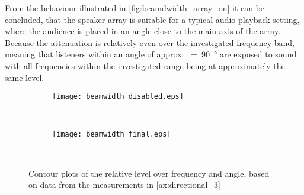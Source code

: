 From the behaviour illustrated in \autoref{fig:beamdwidth_array_on} it can be concluded, that the speaker array is suitable for a typical audio playback setting, where the audience is placed in an angle close to the main axis of the array. Because the attenuation is relatively even over the investigated frequency band, meaning that listeners within an angle of approx. \SI{\pm 90}{\degree} are exposed to sound with all frequencies within the investigated range being at approximately the same level.

\begin{figure}[H]
	\centering
	\begin{subfigure}[c]{\textwidth}
		\texttt{[image: beamwidth\_disabled.eps]}
		\label{fig:beamdwidth_array_off}
	\end{subfigure}\\
		\begin{subfigure}[c]{\textwidth}
		\texttt{[image: beamwidth\_final.eps]}
		\label{fig:beamdwidth_array_on}
	\end{subfigure}\\
	\caption{Contour plots of the relative level over frequency and angle, based on data from the measurements in \autoref{ax:directional_3}}
	\label{fig:beamwidth_array}
\end{figure}